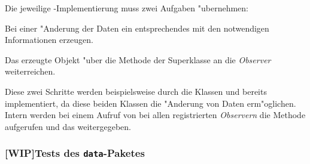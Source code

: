 Die jeweilige -Implementierung muss zwei Aufgaben "ubernehmen:
\begin{enumerate}
	{%
	\renewcommand{\theenumi}{\arabic{enumi}}
	\renewcommand{\labelenumi}{\theenumi}
	\item Bei einer "Anderung der Daten ein entsprechendes  mit den notwendigen Informationen erzeugen.
	\item Das erzeugte Objekt "uber die Methode  der Superklasse  an die \emph{Observer} weiterreichen.
	}
\end{enumerate}
Diese zwei Schritte werden beispielsweise durch die Klassen  und  bereits implementiert, da diese beiden Klassen die "Anderung von Daten erm"oglichen.
Intern werden bei einem Aufruf von  bei allen registrierten \emph{Observern} die Methode  aufgerufen und das  weitergegeben.


\subsubsection{[WIP]Tests des \texttt{data}-Paketes}

